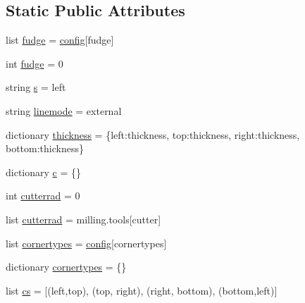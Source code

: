 \subsection*{Static Public Attributes}
\begin{DoxyCompactItemize}
\item 
list \hyperlink{classshapes_1_1_finger_joint_box_side_a184079abaa002c907b608675733490ae}{fudge} = \hyperlink{classpath_1_1_path_a889e352f02dba833077975ce855276ed}{config}\mbox{[}\textquotesingle{}fudge\textquotesingle{}\mbox{]}
\item 
int \hyperlink{classshapes_1_1_finger_joint_box_side_a3ae3ee63817dffa7beea2a0d271e60ed}{fudge} = 0
\item 
string \hyperlink{classshapes_1_1_finger_joint_box_side_a78fb54597f90413a205b9d7a0adc6c0c}{s} = \textquotesingle{}left\textquotesingle{}
\item 
string \hyperlink{classshapes_1_1_finger_joint_box_side_a85cade359cd34d777158202cc3e6674a}{linemode} = \textquotesingle{}external\textquotesingle{}
\item 
dictionary \hyperlink{classshapes_1_1_finger_joint_box_side_a1b08f1a625b6b1bca02dc4dd42d515ea}{thickness} = \{\textquotesingle{}left\textquotesingle{}\+:thickness, \textquotesingle{}top\textquotesingle{}\+:thickness, \textquotesingle{}right\textquotesingle{}\+:thickness, \textquotesingle{}bottom\textquotesingle{}\+:thickness\}
\item 
dictionary \hyperlink{classshapes_1_1_finger_joint_box_side_a5e5865caa2530987c882fb86fbe57c26}{c} = \{\}
\item 
int \hyperlink{classshapes_1_1_finger_joint_box_side_ae038c24a3bbe34afb5419a4e33afa829}{cutterrad} = 0
\item 
list \hyperlink{classshapes_1_1_finger_joint_box_side_abb820730a624a5baa93bfeb45ad3816d}{cutterrad} = milling.\+tools\mbox{[}cutter\mbox{]}
\item 
list \hyperlink{classshapes_1_1_finger_joint_box_side_a9a16221e6316b0f811e841990f151886}{cornertypes} = \hyperlink{classpath_1_1_path_a889e352f02dba833077975ce855276ed}{config}\mbox{[}\textquotesingle{}cornertypes\textquotesingle{}\mbox{]}
\item 
dictionary \hyperlink{classshapes_1_1_finger_joint_box_side_a697b524bcc668931603cd7dc75177803}{cornertypes} = \{\}
\item 
list \hyperlink{classshapes_1_1_finger_joint_box_side_aece206e78443db271178fcfdbafd191c}{cs} = \mbox{[}(\textquotesingle{}left\textquotesingle{},\textquotesingle{}top\textquotesingle{}), (\textquotesingle{}top\textquotesingle{}, \textquotesingle{}right\textquotesingle{}), (\textquotesingle{}right\textquotesingle{}, \textquotesingle{}bottom\textquotesingle{}), (\textquotesingle{}bottom\textquotesingle{},\textquotesingle{}left\textquotesingle{})\mbox{]}
\end{DoxyCompactItemize}
